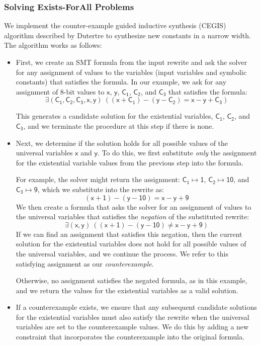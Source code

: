 \documentclass[review, anonymous, acmsmall]{acmart}
\newcommand{\blockmath}[1]{\[\mathsf{#1}\]}
\newcommand{\inline}[1]{$\mathsf{#1}$}
\begin{document}
\subsubsection{Solving Exists-ForAll Problems}
\label{cegis}
We implement the counter-example guided inductive synthesis (CEGIS) algorithm described by Dutertre \cite{dutertre_solving_2015} to synthesize new constants in a narrow width. The algorithm works as follows: 
\begin{itemize}
    \item First, we create an SMT formula from the input rewrite and ask the solver for any assignment of values to the variables (input variables and symbolic constants) that satisfies the formula. In our example, we ask for any assignment of 8-bit values to \inline{x}, \inline{y}, \inline{C_1}, \inline{C_2}, and \inline{C_3} that satisfies the formula:
   \blockmath{\exists (C_1, C_2, C_3, x, y)\ ((x + C_1)  - (y - C_2)  = x - y + C_3)}

    This generates a candidate solution for the existential variables, \inline{C_1}, \inline{C_2}, and \inline{C_3}, and we terminate the procedure at this step if there is none. 
    
    \item Next, we determine if the solution holds for all possible values of the universal variables \inline{x} and \inline{y}. To do this, we first substitute \textit{only} the assignment for the existential variable values from the previous step into the formula. 
    
    For example, the solver might return the assignment: \inline{C_1 \mapsto 1}, \inline{C_2 \mapsto 10}, and \inline{C_3 \mapsto 9}, which we substitute into the rewrite as:
       \blockmath{(x + 1)  - (y - 10)  = x - y + 9}
    We then create a formula that asks the solver for an assignment of values to the universal variables that satisfies the \textit{negation} of the substituted rewrite: 
        \blockmath{\exists(x, y)\ ((x + 1)  - (y - 10)  \neq x - y + 9)}
    If we can find an assignment that satisfies this negation, then the current solution for the existential variables does not hold for all possible values of the universal variables, and we continue the process. We refer to this satisfying assignment as our \textit{counterexample}. 
    
    Otherwise, no assignment satisfies the negated formula, as in this example, and we return the values for the existential variables as a valid solution. 
    
    \item If a counterexample exists, we ensure that any subsequent candidate solutions for the existential variables must also satisfy the rewrite when the universal variables are set to the counterexample values. We do this by adding a new constraint that incorporates the counterexample into the original formula. 
    

\end{itemize}
\end{document}
